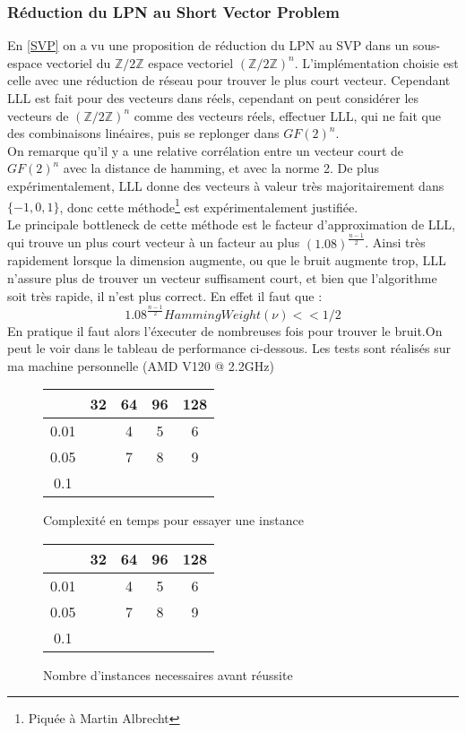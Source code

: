 \documentclass{article}		%
\theoremstyle{definition}
\theoremstyle{plain}
\begin{document}
\subsubsection{Réduction du LPN au Short Vector Problem}\label{Impsvp}
En \ref{SVP} on a vu une proposition de réduction du LPN au SVP dans un
sous-espace vectoriel du $\mathbb{Z}/2\mathbb{Z}$ espace vectoriel
$(\mathbb{Z}/2\mathbb{Z})^n$. L'implémentation choisie est celle avec une
réduction de réseau pour trouver le plus court vecteur. Cependant LLL
est fait pour des vecteurs dans réels, cependant on peut considérer les
vecteurs de $(\mathbb{Z}/2\mathbb{Z})^n$ comme des vecteurs réels,
effectuer LLL, qui ne fait que des combinaisons linéaires, puis se
replonger dans $GF(2)^n$.
\\ 
On remarque qu'il y a une relative corrélation entre un vecteur court de
$GF(2)^n$ avec la distance de hamming, et avec la norme 2. De plus
expérimentalement, LLL donne des vecteurs à valeur très majoritairement
dans $\{-1,0,1\}$, donc cette méthode\footnote{Piquée à Martin Albrecht}
est expérimentalement justifiée.
\\
Le principale bottleneck de cette méthode est le facteur d'approximation
de LLL, qui trouve un plus court vecteur à un facteur au plus 
$(1.08)^{\frac {n-1} {2}}$. Ainsi très rapidement lorsque la
dimension augmente, ou que le bruit augmente trop, LLL n'assure plus
de trouver
un vecteur suffisament court, et bien que l'algorithme soit
très rapide, il n'est plus correct.
En effet il faut que : $$1.08^{\frac {n-1} {2}}HammingWeight(\nu) <<1/2
$$ 
 En pratique il faut alors l'éxecuter
de nombreuses fois pour trouver le bruit.On 
peut le voir dans le tableau de performance ci-dessous. Les tests sont
réalisés sur ma machine personnelle (AMD V120 @ 2.2GHz)
\\
\begin{figure}
\caption{Complexité en temps pour essayer une instance}
\begin{center}
\begin{tabular}{|c |c | c | c | c | }
\hline
   & 32 & 64 & 96 & 128 \\
\hline
 0.01  & &4 & 5 & 6 \\
\hline
  0.05 & &7 & 8 & 9 \\
\hline
 0.1& & & &\\
 \hline
 \end{tabular}
\end{center}
\end{figure}

\begin{figure}
\caption{Nombre d'instances necessaires avant réussite}
\begin{center}
\begin{tabular}{|c |c | c | c | c | }
\hline
   & 32 & 64 & 96 & 128 \\
\hline
 0.01  & &4 & 5 & 6 \\
\hline
  0.05 & &7 & 8 & 9 \\
\hline
 0.1 & & & & \\
 \hline
 \end{tabular}
\end{center}
\end{figure}



\end{document}
